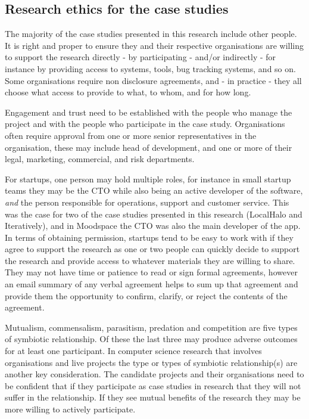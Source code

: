 \subsection{Research ethics for the case studies}
\label{section-research-ethics-for-the-case-studies}
The majority of the case studies presented in this research include other people. It is right and proper to ensure they and their respective organisations are willing to support the research directly - by participating - and/or indirectly - for instance by providing access to systems, tools, bug tracking systems, and so on. Some organisations require non disclosure agreements, and - in practice - they all choose what access to provide to what, to whom, and for how long. 

Engagement and trust need to be established with the people who manage the project and with the people who participate in the case study. Organisations often require approval from one or more senior representatives in the organisation, these may include head of development, and one or more of their legal, marketing, commercial, and risk departments.

For startups, one person may hold multiple roles, for instance in small startup teams they may be the CTO while also being an active developer of the software, \emph{and} the person responsible for operations, support and customer service. This was the case for two of the case studies presented in this research (LocalHalo and Iteratively), and in Moodspace the CTO was also the main developer of the app. In terms of obtaining permission, startups tend to be easy to work with if they agree to support the research as one or two people can quickly decide to support the research and provide access to whatever materials they are willing to share. They may not have time or patience to read or sign formal agreements, however an email summary of any verbal agreement helps to sum up that agreement and provide them the opportunity to confirm, clarify, or reject the contents of the agreement.

Mutualism, commensalism, parasitism, predation and competition are five types of symbiotic relationship. %
Of these the last three may produce adverse outcomes for at least one participant.
In computer science research that involves organisations and live projects the type or types of symbiotic relationship(s) are another key consideration. The candidate projects and their organisations need to be confident that if they participate as case studies in research that they will not suffer in the relationship. If they see mutual benefits of the research they may be more willing to actively participate. 

